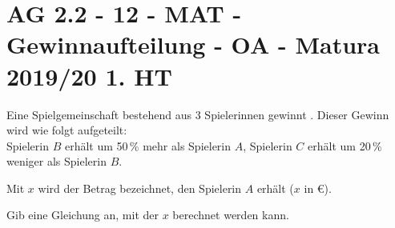 \section{AG 2.2 - 12 - MAT - Gewinnaufteilung - OA - Matura 2019/20 1. HT}

\begin{beispiel}[AG 2.2]{1}
Eine Spielgemeinschaft bestehend aus 3 Spielerinnen gewinnt . Dieser Gewinn wird wie folgt aufgeteilt:\\
Spielerin $B$ erhält um 50\,\% mehr als Spielerin $A$, Spielerin $C$ erhält um 20\,\% weniger als Spielerin $B$.

Mit $x$ wird der Betrag bezeichnet, den Spielerin $A$ erhält ($x$ in \euro).

Gib eine Gleichung an, mit der $x$ berechnet werden kann.

\end{beispiel}